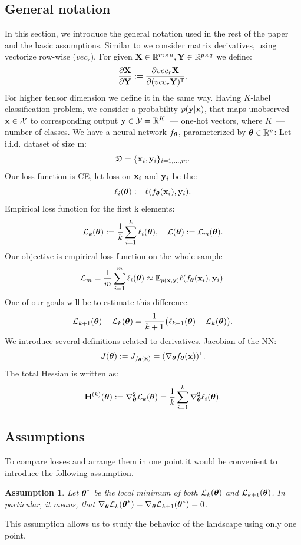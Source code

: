 \documentclass[conference]{IEEEtran}
\newtheorem{assumption}{Assumption}
\begin{document}
\subsection{General notation}
In this section, we introduce the general notation used in the rest of the paper and the basic assumptions. Similar to \cite{Matrixdifferential} we consider matrix derivatives, using vectorize row-wise ($vec_r$). For given $\mathbf{X} \in \mathbb{R}^{m \times n}, \mathbf{Y} \in \mathbb{R}^{p \times q}$ we define:
\begin{align*}
\frac{\partial \bX}{\partial \bY} := \frac{\partial vec_r\bX}{\partial (vec_r\bY)\T}.
\end{align*}
For higher tensor dimension we define it in the same way. Having $K$-label classification problem, we consider a probability $p(\mathbf{y} | \mathbf{x})$, that maps unobserved $\mathbf{x} \in \mathcal{X}$ to corresponding output $\mathbf{y} \in \mathcal{Y} = \mathbb{R}^K$~--- one-hot vectors, where $K$~--- number of classes. We have a neural network $f_{\boldsymbol{\theta}}$, parameterized by $\boldsymbol{\theta} \in \mathbb{R}^{p}$:
Let i.i.d. dataset of size m:
\[\mathfrak{D} = \{\mathbf{x}_i, \mathbf{y}_i\}_{i=1,...,m}.\]
Our loss function is CE, let loss on $\mathbf{x}_i$ and $\mathbf{y}_i$ be the:
\[ \ell_i(\boldsymbol{\theta}) := \ell(f_{\boldsymbol{\theta}}(\mathbf{x}_i), \mathbf{y}_i).\]
Empirical loss function for the first k elements:
\[\mathcal{L}_k(\boldsymbol{\theta}) := \frac{1}{k}\sum\limits_{i=1}^k \ell_i(\boldsymbol{\theta}), \quad \mathcal{L}(\boldsymbol{\theta}) := \mathcal{L}_m(\boldsymbol{\theta}).\]
Our objective is empirical loss function on the whole sample
\[ \mathcal{L}_m = \frac{1}{m}\sum\limits_{i=1}^m\ell_i(\boldsymbol{\theta}) \approx \mathbb{E}_{p(\mathbf{x}, \mathbf{y})}\ell(f_{\boldsymbol{\theta}}(\mathbf{x}_i), \mathbf{y}_i).\]
One of our goals will be to estimate this difference.
\[\mathcal{L}_{k+1}(\boldsymbol{\theta}) - \mathcal{L}_{k}(\boldsymbol{\theta}) = \frac{1}{k+1}\big(\ell_{k+1}(\boldsymbol{\theta}) - \mathcal{L}_{k}(\boldsymbol{\theta})\big).\]
We introduce several definitions related to derivatives.
Jacobian of the NN:
\[J(\btheta) := J_{\f{\bx}} = (\nabla_{\btheta}f_{\btheta}(\bx))\T.\]
The total Hessian is written as:
\[\mathbf{H}^{(k)}(\boldsymbol{\theta}) := \nabla^2_{\boldsymbol{\theta}}\mathcal{L}_k(\boldsymbol{\theta}) = \frac{1}{k}\sum\limits_{i=1}^k\nabla_{\boldsymbol{\theta}}^2\ell_i(\boldsymbol{\theta}).\]


\subsection{Assumptions} 
To compare losses and arrange them in one point it would be convenient to introduce the following assumption.
\begin{assumption}\label{assumpt}
    Let $\boldsymbol{\theta}^*$ be the local minimum of both $\mathcal{L}_{k}(\boldsymbol{\theta})$ and $\mathcal{L}_{k+1}(\boldsymbol{\theta})$.
    In particular, it means, that $\nabla_{\boldsymbol{\theta}}\mathcal{L}_{k}(\boldsymbol{\theta}^*) = \nabla_{\boldsymbol{\theta}}\mathcal{L}_{k+1}(\boldsymbol{\theta}^*) = 0$.
\end{assumption}
This assumption allows us to study the behavior of the landscape using only one point.
\end{document}
